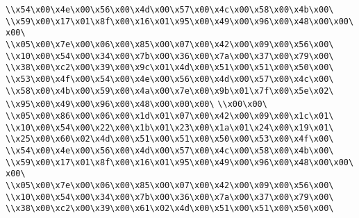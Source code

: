 \verb|\\x54\x00\x4e\x00\x56\x00\x4d\x00\x57\x00\x4c\x00\x58\x00\x4b\x00\|\newline
\verb|\\x59\x00\x17\x01\x8f\x00\x16\x01\x95\x00\x49\x00\x96\x00\x48\x00\x00\x00\|\newline
\verb|\\x05\x00\x7e\x00\x06\x00\x85\x00\x07\x00\x42\x00\x09\x00\x56\x00\|\newline
\verb|\\x10\x00\x54\x00\x34\x00\x7b\x00\x36\x00\x7a\x00\x37\x00\x79\x00\|\newline
\verb|\\x38\x00\xc2\x00\x39\x00\x9c\x01\x4d\x00\x51\x00\x51\x00\x50\x00\|\newline
\verb|\\x53\x00\x4f\x00\x54\x00\x4e\x00\x56\x00\x4d\x00\x57\x00\x4c\x00\|\newline
\verb|\\x58\x00\x4b\x00\x59\x00\x4a\x00\x7e\x00\x9b\x01\x7f\x00\x5e\x02\|\newline
\verb|\\x95\x00\x49\x00\x96\x00\x48\x00\x00\x00\|\newline
\verb|\\x00\x00\|\newline
\verb|\\x05\x00\x86\x00\x06\x00\x1d\x01\x07\x00\x42\x00\x09\x00\x1c\x01\|\newline
\verb|\\x10\x00\x54\x00\x22\x00\x1b\x01\x23\x00\x1a\x01\x24\x00\x19\x01\|\newline
\verb|\\x25\x00\x60\x02\x4d\x00\x51\x00\x51\x00\x50\x00\x53\x00\x4f\x00\|\newline
\verb|\\x54\x00\x4e\x00\x56\x00\x4d\x00\x57\x00\x4c\x00\x58\x00\x4b\x00\|\newline
\verb|\\x59\x00\x17\x01\x8f\x00\x16\x01\x95\x00\x49\x00\x96\x00\x48\x00\x00\x00\|\newline
\verb|\\x05\x00\x7e\x00\x06\x00\x85\x00\x07\x00\x42\x00\x09\x00\x56\x00\|\newline
\verb|\\x10\x00\x54\x00\x34\x00\x7b\x00\x36\x00\x7a\x00\x37\x00\x79\x00\|\newline
\verb|\\x38\x00\xc2\x00\x39\x00\x61\x02\x4d\x00\x51\x00\x51\x00\x50\x00\|\newline
